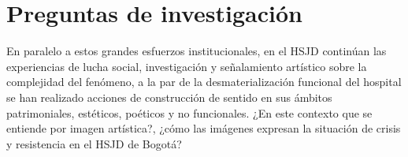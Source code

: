 \section*{Preguntas de investigación}
En paralelo a estos grandes esfuerzos institucionales, en el HSJD continúan las experiencias de lucha social, investigación y señalamiento artístico sobre la complejidad del fenómeno, a la par de la desmaterialización funcional del hospital se han realizado acciones de construcción de sentido en sus ámbitos patrimoniales, estéticos, poéticos y no funcionales. ¿En este contexto que se entiende por imagen artística?, ¿cómo las imágenes expresan la situación de crisis y resistencia en el HSJD de Bogotá?